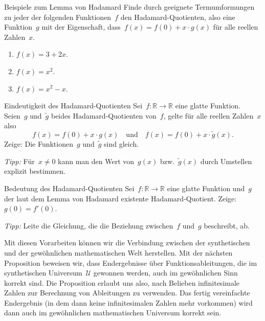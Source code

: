 \documentclass[twoside]{../zirkelblatt}
\newcommand{\RR}{\mathbb{R}}
\newcommand{\U}{\mathcal{U}}
\theoremstyle{definition}
\theoremstyle{plain}
\theoremstyle{remark}
\begin{document}
\begin{aufgabeShaded}{Beispiele zum Lemma von Hadamard}
Finde durch geeignete Termumformungen zu jeder der folgenden Funktionen~$f$ den
Hadamard-Quotienten, also eine Funktion~$g$ mit der Eigenschaft, dass~$f(x) =
f(0) + x \cdot g(x)$ für alle reellen Zahlen~$x$.
\begin{enumerate}
\item $f(x) = 3 + 2x$.
\item $f(x) = x^2$.
\item $f(x) = x^2 - x$.
\end{enumerate}
\end{aufgabeShaded}

\begin{aufgabeShaded}{Eindeutigkeit des Hadamard-Quotienten}
Sei~$f : \RR \to \RR$ eine glatte Funktion. Seien~$g$ und~$\widetilde g$ beides
Hadamard-Quotienten von~$f$, gelte für alle reellen Zahlen~$x$ also
\[ f(x) = f(0) + x \cdot g(x) \quad\text{und}\quad f(x) = f(0) + x \cdot \widetilde g(x). \]
Zeige: Die Funktionen~$g$ und~$\widetilde g$ sind gleich.

\emph{Tipp:} Für~$x \neq 0$ kann man den Wert von~$g(x)$ bzw.~$\widetilde g(x)$
durch Umstellen explizit bestimmen.
\end{aufgabeShaded}

\begin{aufgabeShaded}{Bedeutung des Hadamard-Quotienten}
\label{aufg:bedeutung-hadamard}
Sei~$f : \RR \to \RR$ eine glatte Funktion und~$g$ der laut dem
Lemma von Hadamard existente Hadamard-Quotient. Zeige: $g(0) = f'(0)$.

\emph{Tipp:} Leite die Gleichung, die die Beziehung zwischen~$f$
und~$g$ beschreibt, ab.
\end{aufgabeShaded}

Mit diesen Vorarbeiten können wir die Verbindung zwischen der synthetischen und
der gewöhnlichen mathematischen Welt herstellen. Mit der nächsten Proposition
beweisen wir, dass Endergebnisse über Funktionsableitungen, die im
synthetischen Universum~$\U$ gewonnen werden, auch im gewöhnlichen Sinn korrekt
sind. Die Proposition erlaubt uns also, nach Belieben infinitesimale Zahlen zur
Berechnung von Ableitungen zu verwenden. Das fertig vereinfachte Endergebnis
(in dem dann keine infinitesimalen Zahlen mehr vorkommen) wird dann auch im
gewöhnlichen mathematischen Universum korrekt sein.
\end{document}
